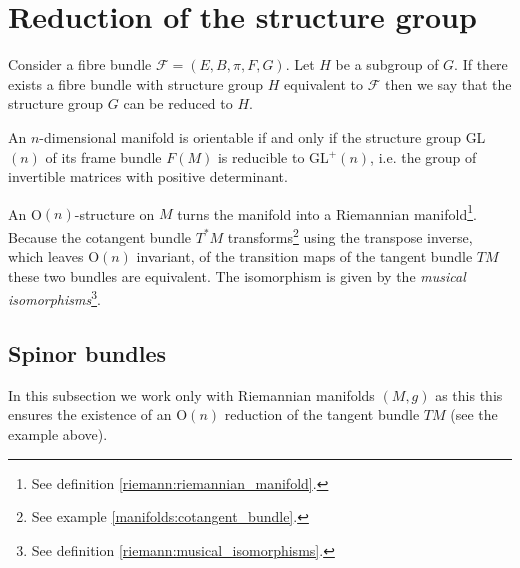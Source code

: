 \section{Reduction of the structure group}

	\begin{construct}
		Consider a fibre bundle $\mathcal{F} = (E, B, \pi, F, G)$. Let $H$ be a subgroup of $G$. If there exists a fibre bundle with structure group $H$ equivalent to $\mathcal{F}$ then we say that the structure group $G$ can be reduced to $H$.
	\end{construct}
	
	\begin{property}
		An $n$-dimensional manifold is orientable if and only if the structure group GL$(n)$ of its frame bundle $F(M)$ is reducible to GL$^+(n)$, i.e. the group of invertible matrices with positive determinant. 
	\end{property}
	
	\begin{example}
		An O$(n)$-structure on $M$ turns the manifold into a Riemannian manifold\footnote{See definition \ref{riemann:riemannian_manifold}.}. Because the cotangent bundle $T^*M$ transforms\footnote{See example \ref{manifolds:cotangent_bundle}.} using the transpose inverse, which leaves O$(n)$ invariant, of the transition maps of the tangent bundle $TM$ these two bundles are equivalent. The isomorphism is given by the \textit{musical isomorphisms}\footnote{See definition \ref{riemann:musical_isomorphisms}.}.
	\end{example}
	
\subsection{Spinor bundles}

	In this subsection we work only with Riemannian manifolds $(M, g)$ as this this ensures the existence of an O$(n)$ reduction of the tangent bundle $TM$ (see the example above).

